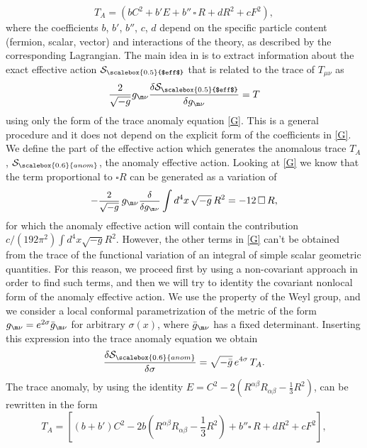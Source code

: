 \documentclass[a4paper,11pt,openright,twoside]{book}
\let\a=\alpha   \let\b=\beta   \let\g=\gamma   \let\d=\delta
\let\n=\nu      \let\x=\xi     \let\p=\pi      \let\r=\rho
\let\s=\sigma  \let\t=\tau     \let\u=\upsilon \let\f=\phi
\newcommand{\sdfrac}[2]{\mbox{\small$\displaystyle\frac{#1}{#2}$}}
\numberwithin{equation}{section}
\begin{document}
{{{{	\begin{equation}
		T_A=\left(bC^2+b'E+b''\,\square\,R+dR^2+cF^2\right),\label{G}
	\end{equation}
	where the coefficients $b$, $b'$, $b''$, $c$, $d$ depend on the specific particle content (fermion, scalar, vector) and interactions of the theory, as described by the corresponding Lagrangian. The main idea in \cite{Riegert:1984kt} is to extract information about the exact effective action $\mathcal{S}_{\scalebox{0.5}{$eff$}}$ that is related to the trace of $T_{\mu\nu}$ as
	\begin{equation}
		\frac{2}{\sqrt{-g}}g_{\m\n}\frac{\d\mathcal{S}_{\scalebox{0.5}{$eff$}}}{\d g_{\m\n}}=T\label{trace1}
	\end{equation}
	using only the form of the trace anomaly equation \eqref{G}. This is a general procedure and it does not depend on the explicit form of the coefficients in \eqref{G}. We define the part of the effective action which generates the anomalous trace $T_A$ , $\mathcal{S}_{\scalebox{0.6}{anom}}$, the {anomaly effective action}. Looking at \eqref{G} we know that the term proportional to $\square R$ can be generated as a variation of 
	\begin{equation}
		-\sdfrac{2}{\sqrt{-g}}\,g_{\m\n}\sdfrac{\d}{\d g_{\m\n}}\int d^4x\,\sqrt{-g}\,R^2=-12\,\square \,R,\label{varRsq}
	\end{equation}
	for which the anomaly effective action will contain the contribution $c/(192\p^2)\int d^4x\sqrt{-g}R^2$. However, the other terms in \eqref{G} can't be obtained from the trace of the functional variation of an integral of simple scalar geometric quantities. For this reason, we proceed first by using a non-covariant approach in order to find such terms, and then we will try to identity the covariant nonlocal form of the anomaly effective action. We use the property of the Weyl group, and we consider a local conformal parametrization of the metric of the form $g_{\m\n}=e^{2\s}\bar g_{\m\n}$ for arbitrary $\sigma(x)$, where $\bar g_{\m\n}$ has a fixed determinant.  
	Inserting this expression into the trace anomaly equation we obtain
	\begin{equation}
		\frac{\d\mathcal{S}_{\scalebox{0.6}{anom}}}{\d\s}=\sqrt{-\bar{g}}\,e^{4\s}\,T_A.\label{an}
	\end{equation}
	The trace anomaly, by using the identity $E=C^2-2(R^{\a\b}R_{\a\b}-\frac{1}{3}R^2)$, can be rewritten in the form
	\begin{equation}
		T_A=\left[(b+b')C^2-2b\left(R^{\a\b}R_{\a\b}-\frac{1}{3}R^2\right)+b''\square\,R+dR^2+cF^2\right],\label{TA}

\end{equation}}}}}
\end{document}
